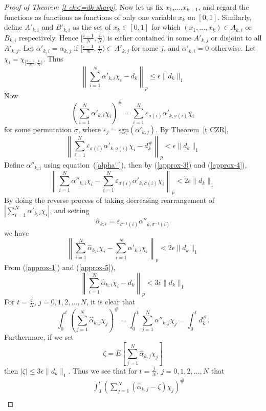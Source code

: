 \documentclass[12pt]{amsart}
\begin{document}
\begin{proof}[Proof of Theorem \ref{t ek<=dk sharp}]
Now let us fix $x_1$,...,$x_{k-1}$, and regard the
functions as functions as functions of only one variable $x_k$ on
$[0,1]$.  Similarly, define $A'_{k,i}$ and $B'_{k,i}$ 
as the set of $x_k \in [0,1]$ for which $(x_1,\dots,x_k) \in A_{k,i}$
or $B_{k,i}$ respectively.
Hence $[\frac{i-1}{N},\frac{i}{N})$ is either contained
in some $A'_{k,j}$ or disjoint to all $A'_{k,j}$. Let
$\alpha'_{k,i}=\alpha_{k,j}$ if
$[\frac{i-1}{N},\frac{i}{N})\subset A'_{k,j}$ for some $j$,
and $\alpha'_{k,i}=0$ otherwise.
Let $\chi _i=\chi_{[\frac{i-1}{N},\frac{i}{N})}$.
Thus
\begin{equation}
\label{approx-1}
\left\|\sum_{i=1}^N \alpha' _{k,i}\chi _i-d_k \right\|_p \leq
\epsilon \|d_k\|_1
\end{equation}
Now
\[
\left( \sum_{i=1}^N \alpha' _{k,i}\chi _i\right)^\# = \sum_{i=1}^N
\varepsilon_{\sigma (i)}\alpha' _{k,\sigma (i)}\chi _i
\]
for some permutation $\sigma $,  where $\varepsilon
_j=\mbox{sgn}(\alpha '_{k,j})$. By Theorem~\ref{t CZR},
\begin{equation}
\label{approx-3}
\left\| \sum_{i=1}^N \varepsilon_{\sigma (i)}\alpha' _{k,\sigma
(i)}\chi _i-d^\#_k \right\|_p <
\epsilon \|d_k\|_1
\end{equation}
Define $\alpha''_{k,i}$ using equation~(\ref{alpha''}), then
by (\ref{approx-3}) and (\ref{approx-4}),
\[
\left\|\sum_{i=1}^N \alpha''_{k,i}\chi_i- \sum_{i=1}^N
\varepsilon_{\sigma (i)}\alpha' _{k,\sigma (i)}\chi _i \right\|_p
< 2 \epsilon \|d_k\|_1
\]
By doing the reverse process of taking decreasing rearrangement of
$|\sum_{i=1}^N \alpha' _{k,i}\chi _i|$, and setting 
\[ \hat \alpha_{k,i} = 
   \varepsilon_{\sigma^{-1}(i)}\alpha''_{k,\sigma^{-1}(i)} \]
we have
\begin{equation}
\label{approx-5}
\left\|\sum_{i=1}^N \hat \alpha_{k,i} \chi_i - 
       \sum_{i=1}^N \alpha' _{k,i}\chi _i \right\|_p <
       2 \epsilon \| d_k\|_1
\end{equation}
From (\ref{approx-1}) and (\ref{approx-5}),
\[
\left\|\sum_{i=1}^N \hat \alpha_{k,i} \chi_i-d_k \right\|_p 
       < 3 \epsilon \|d_k\|_1
\]
For $t=\frac{j}{N}$, $j=0,1,2,...,N$, it is clear that
\[\int_0^t \left( \sum_{j=1}^N \hat{\alpha }_{k,j}\chi _j \right)^\# =
\int_0^t \sum_{j=1}^N \alpha'' _{k,j}\chi _j=\int_0^t d_k^\#.\]
Furthermore, if we set
\[ \zeta = E\left[\sum_{j=1}^N \hat{\alpha }_{k,j}\chi_j\right] \]
then $|\zeta| \le 3 \epsilon \|d_k\|_1$.
Thus we see that for $t=\frac{j}{N}$, $j=0,1,2,...,N$ that
\begin{eqnarray}
\label{int ineq seq}
& &\int_0^t \left(\sum_{j=1}^N \left(\hat{\alpha}_{k,j}-\zeta \right)\chi _j \right)^\# \\

\end{eqnarray}
\end{proof}
\end{document}
